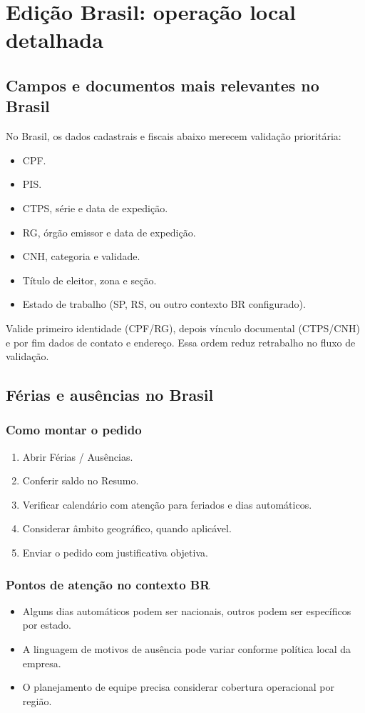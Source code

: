 \chapter{Edição Brasil: operação local detalhada}
\section{Campos e documentos mais relevantes no Brasil}
No Brasil, os dados cadastrais e fiscais abaixo merecem validação prioritária:
\begin{itemize}
  \item CPF.
  \item PIS.
  \item CTPS, série e data de expedição.
  \item RG, órgão emissor e data de expedição.
  \item CNH, categoria e validade.
  \item Título de eleitor, zona e seção.
  \item Estado de trabalho (SP, RS, ou outro contexto BR configurado).
\end{itemize}

\begin{manualnote}
Valide primeiro identidade (CPF/RG), depois vínculo documental (CTPS/CNH) e por fim dados de contato e endereço. Essa ordem reduz retrabalho no fluxo de validação.
\end{manualnote}

\section{Férias e ausências no Brasil}
\subsection{Como montar o pedido}
\begin{enumerate}
  \item Abrir Férias / Ausências.
  \item Conferir saldo no Resumo.
  \item Verificar calendário com atenção para feriados e dias automáticos.
  \item Considerar âmbito geográfico, quando aplicável.
  \item Enviar o pedido com justificativa objetiva.
\end{enumerate}

\subsection{Pontos de atenção no contexto BR}
\begin{itemize}
  \item Alguns dias automáticos podem ser nacionais, outros podem ser específicos por estado.
  \item A linguagem de motivos de ausência pode variar conforme política local da empresa.
  \item O planejamento de equipe precisa considerar cobertura operacional por região.
\end{itemize}

